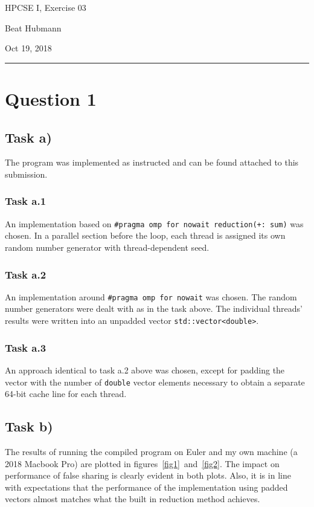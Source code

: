 \documentclass[11pt,a4paper]{article}
\begin{document}
\noindent\parbox{\linewidth}{
 \parbox{.25\linewidth}{ \large HPCSE I, Exercise 03 }\hfill
 \parbox{.5\linewidth}{\begin{center} \large Beat Hubmann \end{center}}\hfill
 \parbox{.2\linewidth}{\begin{flushright} \large Oct 19, 2018 \end{flushright}}
}
\noindent\rule{\linewidth}{2pt}

\section{Question 1}

\subsection{Task a)}

The program was implemented as instructed and can be found attached to this submission.
\subsubsection{Task a.1}
An implementation based on \texttt{\#pragma omp for nowait reduction(+: sum)} was chosen. In a parallel section before the loop, each thread is assigned its own random number generator with thread-dependent seed.

\subsubsection{Task a.2}
An implementation around \texttt{\#pragma omp for nowait} was chosen. The random number generators were dealt with as in the task above. The individual threads' results were written into an unpadded vector \texttt{std::vector<double>}.

\subsubsection{Task a.3}
An approach identical to task a.2 above was chosen, except for padding the vector with the number of \texttt{double} vector elements necessary to obtain a separate 64-bit cache line for each thread.

\subsection{Task b)}
The results of running the compiled program on Euler and my own machine (a 2018 Macbook Pro) are plotted in figures~\ref{fig1}~and~\ref{fig2}. The impact on performance of false sharing is clearly evident in both plots. Also, it is in line with expectations that the performance of the implementation using padded vectors almost matches what the built in reduction method achieves.
\end{document}

